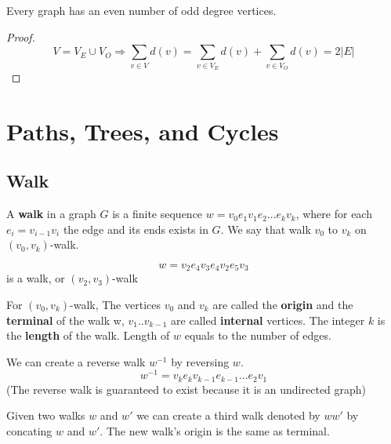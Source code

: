 			\begin{corollary}
				Every graph has an even number of odd degree vertices.
			\end{corollary}

			\begin{proof}
				\begin{equation}
					V = V_E\cup V_O \Rightarrow 
					\sum_{v\in V}d(v) = \sum_{v\in V_E} d(v) + \sum_{v\in V_O}d(v) = 2|E|
				\end {equation}			
			\end{proof}

	\chapter{Paths, Trees, and Cycles}
		\section{Walk}
			\begin{definition}[walk]
				A \textbf{walk} in a graph $G$ is a finite sequence $w=v_0e_1v_1e_2...e_kv_k$, where for each $e_i=v_{i-1}v_i$ the edge and its ends exists in $G$. We say that walk $v_0$ to $v_k$ on $(v_0, v_k)$-walk.
			\end{definition}

			\begin{example}
				\begin{equation}
					w = v_2e_4v_3e_4v_2e_5v_3
				\end{equation}
				is a walk, or $(v_2, v_3)$-walk				
			\end{example}

			\begin{definition}
				For $(v_0, v_k)$-walk, The vertices $v_0$ and $v_k$ are called the \textbf{origin} and the \textbf{terminal} of the walk w, $v_1..v_{k-1}$ are called \textbf{internal} vertices. The integer $k$ is the \textbf{length} of the walk. Length of $w$ equals to the number of edges.
			\end{definition}
			
			We can create a reverse walk $w^{-1}$ by reversing $w$.
			\begin{equation}
				w^{-1} = v_ke_kv_{k-1}e_{k-1}...e_2v_1
			\end{equation}
			(The reverse walk is guaranteed to exist because it is an undirected graph)

			Given two walks $w$ and $w'$ we can create a third walk denoted by $ww'$ by concating $w$ and $w'$. The new walk's origin is the same as terminal.

